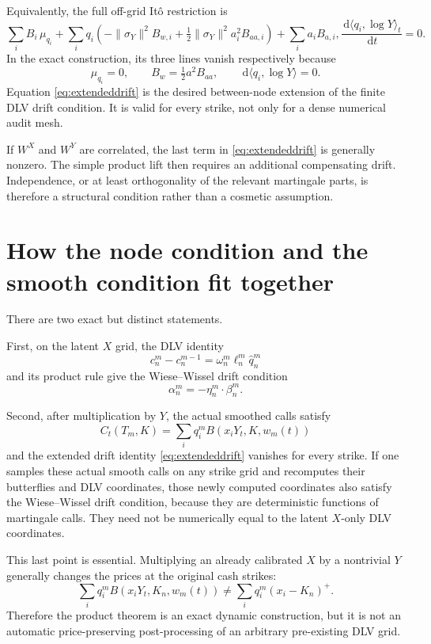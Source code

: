 \documentclass[11pt,a4paper]{article}
\newcommand{\dd}{\,\mathrm d}
\begin{document}
Equivalently, the full off-grid It\^o restriction is
\begin{equation}
 \boxed{
 \sum_i B_i\,\mu_{q_i}
 +\sum_iq_i\left(
 -\lVert\sigma_Y\rVert^2B_{w,i}
 +\tfrac12\lVert\sigma_Y\rVert^2a_i^2B_{aa,i}
 \right)
 +\sum_i a_iB_{a,i},
       \frac{\dd\langle q_i,\log Y\rangle_t}{\dd t}=0.}
 \label{eq:extendeddrift}
\end{equation}
In the exact construction, its three lines vanish respectively because
\begin{equation}
 \mu_{q_i}=0,\qquad
 B_w=\tfrac12a^2B_{aa},\qquad
 \dd\langle q_i,\log Y\rangle=0.
 \label{eq:threecancel}
\end{equation}
Equation \eqref{eq:extendeddrift} is the desired between-node extension of the
finite DLV drift condition.  It is valid for every strike, not only for a
dense numerical audit mesh.

If $W^X$ and $W^Y$ are correlated, the last term in
\eqref{eq:extendeddrift} is generally nonzero.  The simple product lift then
requires an additional compensating drift.  Independence, or at least
orthogonality of the relevant martingale parts, is therefore a structural
condition rather than a cosmetic assumption.

\section{How the node condition and the smooth condition fit together}

There are two exact but distinct statements.

First, on the latent $X$ grid, the DLV identity
\[
 c_n^m-c_n^{m-1}
 =\omega_n^m\ell_n^m\widehat q_n^m
\]
and its product rule give the Wiese--Wissel drift condition
\[
 \alpha_n^m=-\eta_n^m\cdot\beta_n^m.
\]

Second, after multiplication by $Y$, the actual smoothed calls satisfy
\[
 C_t(T_m,K)=\sum_iq_i^mB(x_iY_t,K,w_m(t))
\]
and the extended drift identity \eqref{eq:extendeddrift} vanishes for every
strike.  If one samples these actual smooth calls on any strike grid and
recomputes their butterflies and DLV coordinates, those newly computed
coordinates also satisfy the Wiese--Wissel drift condition, because they are
deterministic functions of martingale calls.  They need not be numerically
equal to the latent $X$-only DLV coordinates.

This last point is essential.  Multiplying an already calibrated $X$ by a
nontrivial $Y$ generally changes the prices at the original cash strikes:
\begin{equation}
 \sum_iq_i^m B(x_iY_t,K_n,w_m(t))
 \neq
 \sum_iq_i^m(x_i-K_n)^+ .
 \label{eq:notpreserve}
\end{equation}
Therefore the product theorem is an exact dynamic construction, but it is not
an automatic price-preserving post-processing of an arbitrary pre-existing
DLV grid.
\end{document}
